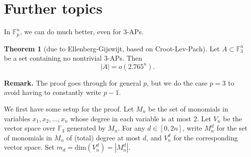 \documentclass{article}
\theoremstyle{definition}
\newtheorem{theorem}{Theorem}[section]
\begin{document}
\section{Further topics}
In $\mathbb{F}_p^n$, we can do much better, even for 3-APs.
\begin{theorem}[due to Ellenberg-Gijswijt, based on Croot-Lev-Pach]\label{theorem4.1}
    Let $A \subset \mathbb{F}_3^n$ be a set containing no nontrivial 3-APs. Then \[
    \left|A\right| = o(2.765^n).
    \]
\end{theorem}
\textbf{Remark.} The proof goes through for general $p$, but we do the case $p=3$ to avoid having to constantly write $p-1$.
\vspace{1mm}
 
We first have some setup for the proof. Let $M_n$ be the set of monomials in variables $x_1,x_2,\ldots,x_n$ whose degree in each variable is at most 2. Let $V_n$ be the vector space over $\mathbb{F}_3$ generated by $M_n$. For any $d \in [0,2n]$, write $M_n^d$ for the set of monomials in $M_n$ of (total) degree at most $d$, and $V_n^d$ for the corresponding vector space. Set $m_d = \text{dim}(V_n^d) = \left|M_n^d\right|$.
\end{document}
